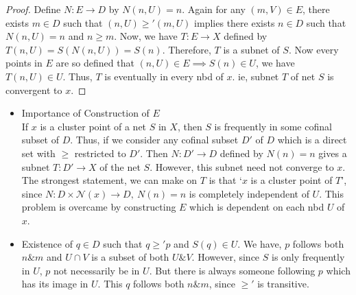 \begin{proof}
	Define $N : E \to D$ by $N(n,U) = n$. Again for any $(m,V) \in E$, there exists $m \in D$ such that $(n,U) \ge' (m,U)$ implies there exists $n \in D$ such that  $N(n,U) = n$ and $n \ge m$. Now, we have $T : E \to X$ defined by $T(n,U) = S(N(n,U)) = S(n)$. Therefore, $T$ is a subnet of $S$. Now every points in $E$ are so defined that $(n,U) \in E \implies S(n) \in U$, we have $T(n,U) \in U$. Thus, $T$ is eventually in every nbd of $x$. ie, subnet $T$ of net $S$ is convergent to $x$.
\end{proof}

\begin{remark}
	\begin{itemize}
		\item  Importance of Construction of $E$\\ If $x$ is a cluster point of a net $S$ in $X$, then $S$ is frequently in some cofinal subset of $D$. Thus, if we consider any cofinal subset $D'$ of $D$ which is a direct set with $\ge$ restricted to $D'$. Then $N : D' \to D$ defined by $N(n)=n$ gives a subnet $T : D' \to X$ of the net $S$. However, this subnet need not converge to $x$. The strongest statement, we can make on $T$ is that `$x$ is a cluster point of $T$', since $N : D \times \mathcal{N}(x) \to D,\ N(n) = n$ is completely independent of $U$. This problem is overcame by constructing $E$ which is dependent on each nbd $U$ of $x$.
		\item Existence of $q \in D$ such that $q \ge' p$ and $S(q) \in U$. We have, $p$ follows both $n \& m$ and $U \cap V$ is a subset of both $U \& V$. However, since $S$ is only frequently in $U$, $p$ not necessarily be in $U$. But there is always someone following $p$ which has its image in $U$. This $q$ follows both $n \& m$, since $\ge'$ is transitive.
	\end{itemize}
\end{remark}


